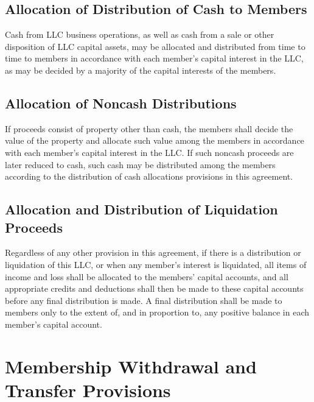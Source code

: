\documentclass{article}
\begin{document}
			\subsection{Allocation of Distribution of Cash to Members}
			Cash from LLC business operations, as well as cash from a sale or other disposition of LLC capital assets, may be allocated and distributed from time to time to members in accordance with each member's capital interest in the LLC, as may be decided by a majority of the capital interests of the members.

			\subsection{Allocation of Noncash Distributions}
			If proceeds consist of property other than cash, the members shall decide the value of the property and allocate such value among the members in accordance with each member's capital interest in the LLC. If such noncash proceeds are later reduced to cash, such cash may be distributed among the members according to the distribution of cash allocations provisions in this agreement.

			\subsection{Allocation and Distribution of Liquidation Proceeds}
			Regardless of any other provision in this agreement, if there is a distribution or liquidation of this LLC, or when any member's interest is liquidated, all items of income and loss shall be allocated to the members' capital accounts, and all appropriate credits and deductions shall then be made to these capital accounts before any final distribution is made. A final distribution shall be made to members only to the extent of, and in proportion to, any positive balance in each member's capital account.

		\section{Membership Withdrawal and Transfer Provisions}
\end{document}
